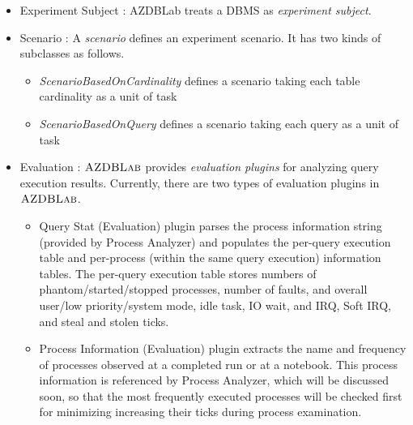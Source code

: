 \documentclass[conference]{IEEEtran}
\def\azdb{\hbox{\sc AZDBLab}}
\begin{document}
\begin{itemize}

\item Experiment Subject : {\sc AZDBLab} treats a DBMS as {\em experiment subject}. 

\item Scenario : A {\em scenario} defines an experiment scenario. 
It has two kinds of subclasses as follows.

\begin{itemize}
\item {\em ScenarioBasedOnCardinality} defines a scenario taking each table cardinality as a unit of task 
\item {\em ScenarioBasedOnQuery} defines a scenario taking each query as a unit of task 
\end{itemize}

\item Evaluation : $\azdb$ provides {\em evaluation plugins} for analyzing query execution results. 
Currently, there are two types of evaluation plugins in $\azdb$. 

\begin{itemize}
\item Query Stat (Evaluation) plugin parses the process information string (provided by Process Analyzer) and 
populates the per-query execution table and per-process (within the same query execution) information tables. 
The per-query execution table stores numbers of phantom/started/stopped processes, number of faults, and 
overall user/low priority/system mode, idle task, IO wait, and IRQ, Soft IRQ, and steal and stolen ticks. 


\item Process Information (Evaluation) plugin extracts 
the name and frequency of processes observed at a completed run or at a notebook. 
This process information is referenced by Process Analyzer, which will be discussed soon, 
so that the most frequently executed processes will be checked first for minimizing 
increasing their ticks during process examination.  

\end{itemize}

\end{itemize}
\end{document}
